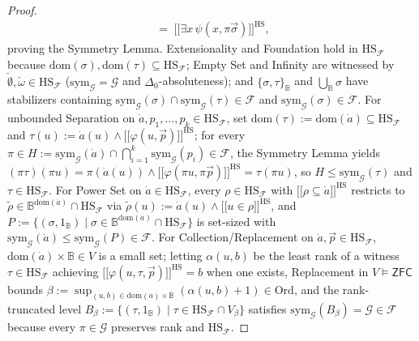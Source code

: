\documentclass[10pt,twoside,openright]{book}
\providecommand{\llbracket}{\mathopen{[\![}}
\providecommand{\rrbracket}{\mathclose{]\!]}}
\theoremstyle{crmplain}
\theoremstyle{crmdef}
\theoremstyle{crmremark}
\begin{document}
\begin{proof}
\[\begin{aligned}
    \;=\; \llbracket \exists x\,\psi(x, \pi\vec{\sigma}) \rrbracket^{\mathrm{HS}},
  \end{aligned}
\]
proving the Symmetry Lemma. Extensionality and Foundation hold in $\mathrm{HS}_{\mathcal{F}}$ because $\mathrm{dom}(\sigma), \mathrm{dom}(\tau) \subseteq \mathrm{HS}_{\mathcal{F}}$; Empty Set and Infinity are witnessed by $\check{\emptyset}, \check{\omega} \in \mathrm{HS}_{\mathcal{F}}$ ($\mathrm{sym}_{\mathcal{G}} = \mathcal{G}$ and $\Delta_0$-absoluteness); and $\{\sigma, \tau\}_{\mathbb{B}}$ and $\bigcup_{\mathbb{B}} \sigma$ have stabilizers containing $\mathrm{sym}_{\mathcal{G}}(\sigma) \cap \mathrm{sym}_{\mathcal{G}}(\tau) \in \mathcal{F}$ and $\mathrm{sym}_{\mathcal{G}}(\sigma) \in \mathcal{F}$. For unbounded Separation on $\dot{a}, p_1, \dots, p_k \in \mathrm{HS}_{\mathcal{F}}$, set $\mathrm{dom}(\tau) := \mathrm{dom}(\dot{a}) \subseteq \mathrm{HS}_{\mathcal{F}}$ and $\tau(u) := \dot{a}(u) \wedge \llbracket \varphi(u, \vec{p}) \rrbracket^{\mathrm{HS}}$; for every $\pi \in H := \mathrm{sym}_{\mathcal{G}}(\dot{a}) \cap \bigcap_{i=1}^k \mathrm{sym}_{\mathcal{G}}(p_i) \in \mathcal{F}$, the Symmetry Lemma yields $(\pi\tau)(\pi u) = \pi(\dot{a}(u)) \wedge \llbracket \varphi(\pi u, \pi\vec{p}) \rrbracket^{\mathrm{HS}} = \tau(\pi u)$, so $H \le \mathrm{sym}_{\mathcal{G}}(\tau)$ and $\tau \in \mathrm{HS}_{\mathcal{F}}$. For Power Set on $\dot{a} \in \mathrm{HS}_{\mathcal{F}}$, every $\rho \in \mathrm{HS}_{\mathcal{F}}$ with $\llbracket \rho \subseteq \dot{a} \rrbracket^{\mathrm{HS}}$ restricts to $\tilde{\rho} \in \mathbb{B}^{\mathrm{dom}(\dot{a})} \cap \mathrm{HS}_{\mathcal{F}}$ via $\tilde{\rho}(u) := \dot{a}(u) \wedge \llbracket u \in \rho \rrbracket^{\mathrm{HS}}$, and $P := \{(\sigma, 1_{\mathbb{B}}) \mid \sigma \in \mathbb{B}^{\mathrm{dom}(\dot{a})} \cap \mathrm{HS}_{\mathcal{F}}\}$ is set-sized with $\mathrm{sym}_{\mathcal{G}}(\dot{a}) \le \mathrm{sym}_{\mathcal{G}}(P) \in \mathcal{F}$. For Collection/Replacement on $\dot{a}, \vec{p} \in \mathrm{HS}_{\mathcal{F}}$, $\mathrm{dom}(\dot{a}) \times \mathbb{B} \in V$ is a small set; letting $\alpha(u, b)$ be the least rank of a witness $\tau \in \mathrm{HS}_{\mathcal{F}}$ achieving $\llbracket \varphi(u, \tau, \vec{p}) \rrbracket^{\mathrm{HS}} = b$ when one exists, Replacement in $V \models \mathsf{ZFC}$ bounds $\beta := \sup_{(u,b) \in \mathrm{dom}(\dot{a}) \times \mathbb{B}} (\alpha(u, b) + 1) \in \mathrm{Ord}$, and the rank-truncated level $B_\beta := \{(\tau, 1_{\mathbb{B}}) \mid \tau \in \mathrm{HS}_{\mathcal{F}} \cap V_\beta\}$ satisfies $\mathrm{sym}_{\mathcal{G}}(B_\beta) = \mathcal{G} \in \mathcal{F}$ because every $\pi \in \mathcal{G}$ preserves rank and $\mathrm{HS}_{\mathcal{F}}$.


\end{proof}
\end{document}
